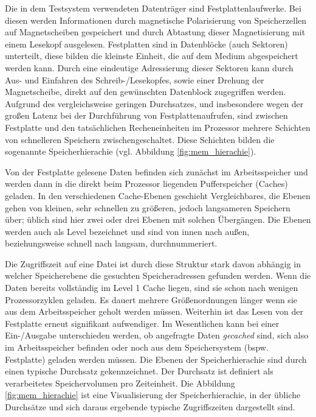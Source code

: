 \documentclass[
	12pt,
	a4paper,
	BCOR10mm,
	DIV14,
	listof=totoc,
	bibliography=totoc,
	headsepline
]{scrreprt}
\begin{document}
Die in dem Testsystem verwendeten Datenträger sind Festplattenlaufwerke. Bei diesen werden Informationen durch magnetische Polarisierung von Speicherzellen auf Magnetscheiben gespeichert und durch Abtastung dieser Magnetisierung mit einem Lesekopf ausgelesen.
Festplatten sind in Datenblöcke (auch Sektoren) unterteilt, diese bilden die kleinste Einheit, die auf dem Medium abgespeichert werden kann. Durch eine eindeutige Adressierung dieser Sektoren kann durch Aus- und Einfahren des Schreib-/Lesekopfes, sowie einer Drehung der Magnetscheibe, direkt auf den gewünschten Datenblock zugegriffen werden.
Aufgrund des vergleichsweise geringen Durchsatzes, und insbesondere wegen der großen Latenz bei der Durchführung von Festplattenaufrufen, sind zwischen Festplatte und den tatsächlichen Recheneinheiten im Prozessor mehrere Schichten von schnelleren Speichern zwischengeschaltet. Diese Schichten bilden die sogenannte Speicherhierachie (vgl. Abbildung \ref{fig:mem_hierachie}).\medskip

Von der Festplatte gelesene Daten befinden sich zunächst im Arbeitsspeicher und werden dann in die direkt beim Prozessor liegenden Pufferspeicher (Caches) geladen.
In den verschiedenen Cache-Ebenen geschieht Vergleichbares, die Ebenen gehen von kleinen, sehr schnellen zu größeren, jedoch langsameren Speichern über; üblich sind hier zwei oder drei Ebenen mit solchen Übergängen. Die Ebenen werden auch als Level bezeichnet und sind von innen nach außen, beziehungsweise schnell nach langsam, durchnummeriert. 
\medskip

Die Zugriffszeit auf eine Datei ist durch diese Struktur stark davon abhängig in welcher Speicherebene die gesuchten Speicheradressen gefunden werden. Wenn die Daten bereits vollständig im Level 1 Cache liegen, sind sie schon nach wenigen Prozessorzyklen geladen. Es dauert mehrere Größenordnungen länger wenn sie aus dem Arbeitsspeicher geholt werden müssen. Weiterhin ist das Lesen von der Festplatte erneut signifikant aufwendiger. Im Wesentlichen kann bei einer Ein-/Ausgabe unterschieden werden, ob angefragte Daten \textit{gecached} sind, sich also im Arbeitsspeicher befinden oder noch aus dem Speichersystem (bspw. Festplatte) geladen werden müssen.
Die Ebenen der Speicherhierachie sind durch einen typische Durchsatz gekennzeichnet. Der Durchsatz ist definiert als verarbeitetes Speichervolumen pro Zeiteinheit. Die Abbildung \ref{fig:mem_hierachie} ist eine Visualisierung der Speicherhierachie, in der übliche Durchsätze und sich daraus ergebende typische Zugriffszeiten dargestellt sind.
\end{document}
